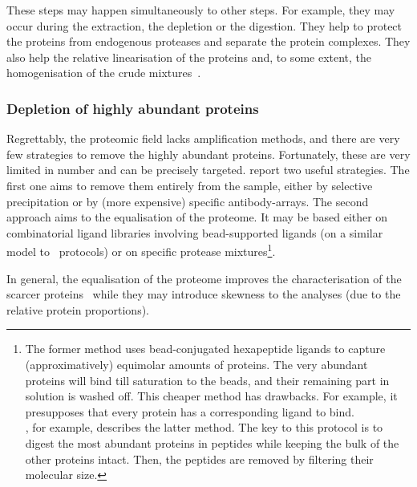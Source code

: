 These steps may happen simultaneously to other steps. For example, they may
occur during the extraction, the depletion or the digestion. They help to protect
the proteins from endogenous proteases and separate the protein complexes. They
also help the relative linearisation of the proteins and, to some extent,
the homogenisation of the crude mixtures~.\mybr\

\subsubsection{Depletion of highly abundant proteins}

Regrettably, the proteomic field lacks amplification methods, and
there are very few strategies to remove the highly abundant proteins. Fortunately,
these are very limited in number and can be precisely targeted.
\citet{Zhang2014} report two useful strategies. The first one aims to remove
them entirely from the sample, either by selective
precipitation or by (more expensive) specific antibody-arrays.
The second approach aims to the equalisation of the proteome.
It may be based either on combinatorial ligand libraries involving
bead-supported ligands (on a similar model to \Rnaseq\ protocols)
or on specific protease mixtures\footnote{The former method uses bead-conjugated
hexapeptide ligands to capture (approximatively) equimolar amounts of proteins.
The very abundant proteins will bind till saturation to the beads, and their
remaining part in solution is washed off. This cheaper method has drawbacks.
For example, it presupposes that every protein has a corresponding ligand to bind.
\\\citet{MichaelMentenDepletion}, for example, describes the latter method. The
key to this protocol is to digest the most abundant proteins in peptides while
keeping the bulk of the other proteins intact.
Then, the peptides are removed by filtering their molecular size.}.\mybr\

In general, the equalisation of the proteome improves the characterisation
of the scarcer proteins~ while they may introduce skewness
to the analyses (due to the relative protein proportions).\mybr\

